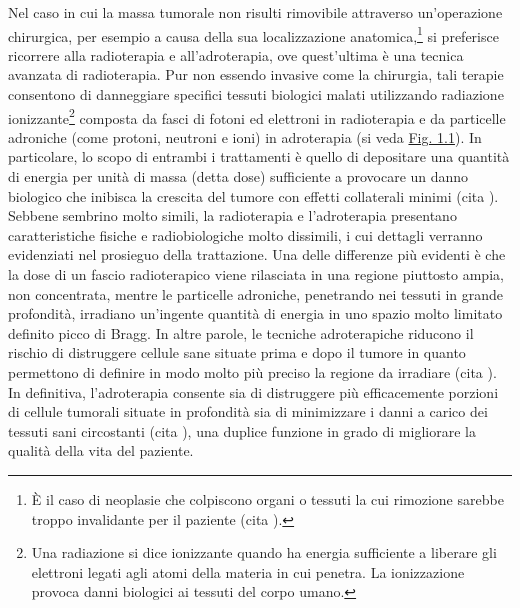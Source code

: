 \documentclass[12pt,a4paper,twoside]{report}
\begin{document}
	Nel caso in cui la massa tumorale non risulti rimovibile attraverso un'operazione chirurgica, per esempio a causa della sua localizzazione anatomica,\footnote{\`E il caso di neoplasie che colpiscono organi o tessuti la cui rimozione sarebbe troppo invalidante per il paziente (cita
	).} si preferisce ricorrere alla radioterapia e all'adroterapia, ove quest'ultima è una tecnica avanzata di radioterapia. Pur non essendo invasive come la chirurgia, tali terapie consentono di danneggiare specifici tessuti biologici malati utilizzando radiazione ionizzante\footnote{Una radiazione si dice ionizzante quando ha energia sufficiente a liberare gli elettroni legati agli atomi della materia in cui penetra. La ionizzazione provoca danni biologici ai tessuti del corpo umano.} composta da fasci di fotoni ed elettroni in radioterapia e da particelle adroniche (come protoni, neutroni e ioni) in adroterapia (si veda \hyperref[fig:simulation]{Fig. 1.1}). In particolare, lo scopo di entrambi i trattamenti è quello di depositare una quantità di energia per unità di massa (detta dose) sufficiente a provocare un danno biologico che inibisca la crescita del tumore con effetti collaterali minimi (cita
	). Sebbene sembrino molto simili, la radioterapia e l'adroterapia presentano caratteristiche fisiche e radiobiologiche molto dissimili, i cui dettagli verranno evidenziati nel prosieguo della trattazione. Una delle differenze più evidenti è che la dose di un fascio radioterapico viene rilasciata in una regione piuttosto ampia, non concentrata, mentre le particelle adroniche, penetrando nei tessuti in grande profondità, irradiano un'ingente quantità di energia in uno spazio molto limitato definito picco di Bragg. In altre parole, le tecniche adroterapiche riducono il rischio di distruggere cellule sane situate prima e dopo il tumore in quanto permettono di definire in modo molto più preciso la regione da irradiare (cita
	). In definitiva, l'adroterapia consente sia di distruggere più efficacemente porzioni di cellule tumorali situate in profondità sia di minimizzare i danni a carico dei tessuti sani circostanti (cita
	), una duplice funzione in grado di migliorare la qualità della vita del paziente.
\end{document}

